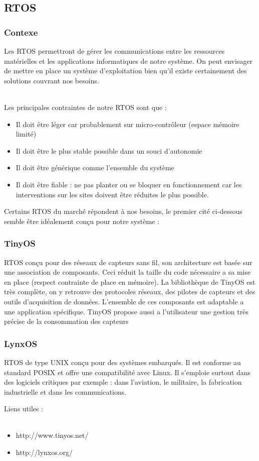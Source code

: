 
\subsection{RTOS}
	\subsubsection {Contexe}
		Les RTOS permettront de gérer les communications entre les ressources matérielles et les applications informatiques de notre système. On peut envisager de mettre en place un système d'exploitation bien qu'il existe certainement des solutions couvrant nos besoins. \\~
		
		Les principales contraintes de notre RTOS sont que :
		\begin{itemize}
				\item Il doit être léger car probablement sur micro-contrôleur (espace mémoire limité)
				\item Il doit être le plus stable possible dans un souci d'autonomie
				\item Il doit être générique comme l'ensemble du système
				\item Il doit être fiable : ne pas planter ou se bloquer en fonctionnement car les interventions sur les sites doivent être réduites le plus possible.
		\end{itemize}

		Certains RTOS du marché répondent à nos besoins, le premier cité ci-dessous semble être idéalement conçu pour notre système :
		
		\subsubsection{TinyOS}
		RTOS conçu pour des réseaux de capteurs sans fil, son architecture est basée sur une association de composants. Ceci réduit la taille du code nécessaire a sa mise en place (respect contrainte de place en mémoire). La bibliothèque de TinyOS est très complète, on y retrouve des protocoles réseaux, des pilotes de capteurs et des outils d'acquisition de données. L'ensemble de ces composants est adaptable a une application spécifique. TinyOS propose aussi a l'utilisateur une gestion très précise de la consommation des capteurs

		\subsubsection{LynxOS}
		RTOS de type UNIX conçu pour des systèmes embarqués. Il est conforme au standard POSIX et offre une compatibilité avec Linux. Il s'emploie surtout dans des logiciels critiques par exemple : dans l'aviation, le militaire, la fabrication industrielle et dans les communications.



Liens utiles : \\~
\begin {itemize}
	\item http://www.tinyos.net/
	\item http://lynxos.org/
\end {itemize}

